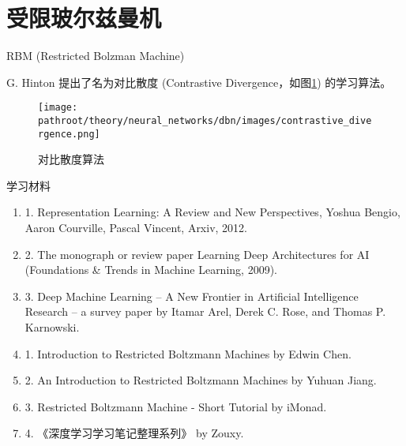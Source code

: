 \section{受限玻尔兹曼机}

RBM (Restricted Bolzman Machine)

G. Hinton 提出了名为对比散度 (Contrastive Divergence，如图\ref{fig:contrastive_divergence}) 的学习算法。

\begin{figure}[ht]
    \centering
    \texttt{[image: \\pathroot/theory/neural\_networks/dbn/images/contrastive\_divergence.png]}
    \caption{对比散度算法}
    \label{fig:contrastive_divergence}
\end{figure}



学习材料
\begin{enumerate}
\item 1. Representation Learning: A Review and New Perspectives, Yoshua Bengio, Aaron Courville, Pascal Vincent, Arxiv, 2012.
\item 2. The monograph or review paper Learning Deep Architectures for AI (Foundations \& Trends in Machine Learning, 2009).
\item 3. Deep Machine Learning – A New Frontier in Artificial Intelligence Research – a survey paper by Itamar Arel, Derek C. Rose, and Thomas P. Karnowski.
\item 1. Introduction to Restricted Boltzmann Machines by Edwin Chen.
\item 2. An Introduction to Restricted Boltzmann Machines by Yuhuan Jiang.
\item 3. Restricted Boltzmann Machine - Short Tutorial by iMonad.
\item 4. 《深度学习学习笔记整理系列》 by Zouxy.
\end{enumerate}



\ifx\mlbook\undefined
    
\fi
